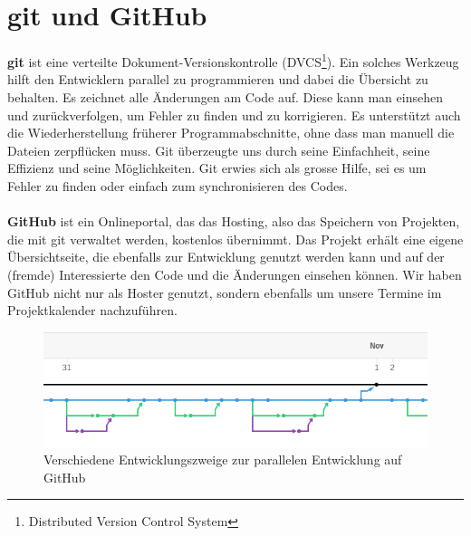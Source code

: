 \documentclass[11pt,a4paper]{scrbook}
\begin{document}
\section{git und GitHub}
\textbf{git} ist eine verteilte Dokument-Versionskontrolle (DVCS\footnote{Distributed Version Control System}). Ein solches Werkzeug hilft
den Entwicklern parallel zu programmieren und dabei die Übersicht zu behalten. Es zeichnet alle Änderungen am Code auf.  Diese kann man einsehen und zurückverfolgen, um Fehler zu finden und zu korrigieren. Es unterstützt auch die Wiederherstellung früherer Programmabschnitte, ohne dass man
manuell die Dateien zerpflücken muss. 
Git überzeugte uns durch seine Einfachheit, seine Effizienz und seine Möglichkeiten.
Git erwies sich als grosse Hilfe, sei es um Fehler zu finden oder einfach zum synchronisieren des Codes.
\\
\\
\textbf{GitHub} ist ein
Onlineportal, das das Hosting, also das Speichern von Projekten, die mit git verwaltet werden, kostenlos übernimmt. Das Projekt erhält eine eigene Übersichtseite,
die ebenfalls zur Entwicklung genutzt werden kann und auf der (fremde) Interessierte den Code und die Änderungen einsehen können. Wir haben GitHub nicht nur
als Hoster genutzt, sondern ebenfalls um unsere Termine im Projektkalender nachzuführen.
\begin{figure}
\centering
\includegraphics[scale=1]{img/branches.png}
\caption{Verschiedene Entwicklungszweige zur parallelen Entwicklung auf GitHub}
\label{fig:branches}
\end{figure}
\end{document}
